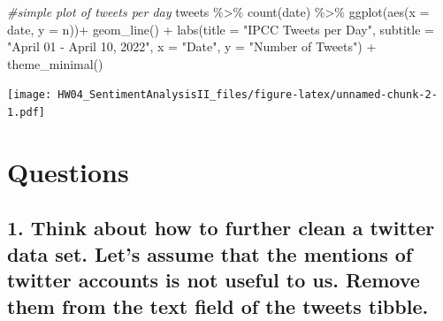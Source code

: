 \documentclass[
]{article}
\newenvironment{Shaded}{\begin{snugshade}}{\end{snugshade}}
\newcommand{\AttributeTok}[1]{\textcolor[rgb]{0.77,0.63,0.00}{#1}}
\newcommand{\CommentTok}[1]{\textcolor[rgb]{0.56,0.35,0.01}{\textit{#1}}}
\newcommand{\FunctionTok}[1]{\textcolor[rgb]{0.00,0.00,0.00}{#1}}
\newcommand{\NormalTok}[1]{#1}
\newcommand{\SpecialCharTok}[1]{\textcolor[rgb]{0.00,0.00,0.00}{#1}}
\newcommand{\StringTok}[1]{\textcolor[rgb]{0.31,0.60,0.02}{#1}}
\begin{document}
\begin{Shaded}
\begin{Highlighting}[]
\CommentTok{\#simple plot of tweets per day}
\NormalTok{tweets }\SpecialCharTok{\%\textgreater{}\%}
  \FunctionTok{count}\NormalTok{(date) }\SpecialCharTok{\%\textgreater{}\%}
  \FunctionTok{ggplot}\NormalTok{(}\FunctionTok{aes}\NormalTok{(}\AttributeTok{x =}\NormalTok{ date, }\AttributeTok{y =}\NormalTok{ n))}\SpecialCharTok{+}
  \FunctionTok{geom\_line}\NormalTok{() }\SpecialCharTok{+}
  \FunctionTok{labs}\NormalTok{(}\AttributeTok{title =} \StringTok{"IPCC Tweets per Day"}\NormalTok{,}
       \AttributeTok{subtitle =} \StringTok{"April 01 {-} April 10, 2022"}\NormalTok{,}
       \AttributeTok{x =} \StringTok{"Date"}\NormalTok{,}
       \AttributeTok{y =} \StringTok{"Number of Tweets"}\NormalTok{) }\SpecialCharTok{+}
  \FunctionTok{theme\_minimal}\NormalTok{()}
\end{Highlighting}
\end{Shaded}

\texttt{[image: HW04\_SentimentAnalysisII\_files/figure-latex/unnamed-chunk-2-1.pdf]}

\hypertarget{questions}{%
\section{Questions}\label{questions}}

\hypertarget{think-about-how-to-further-clean-a-twitter-data-set.-lets-assume-that-the-mentions-of-twitter-accounts-is-not-useful-to-us.-remove-them-from-the-text-field-of-the-tweets-tibble.}{%
\subsection{1. Think about how to further clean a twitter data set.
Let's assume that the mentions of twitter accounts is not useful to us.
Remove them from the text field of the tweets
tibble.}\label{think-about-how-to-further-clean-a-twitter-data-set.-lets-assume-that-the-mentions-of-twitter-accounts-is-not-useful-to-us.-remove-them-from-the-text-field-of-the-tweets-tibble.}}
\end{document}

